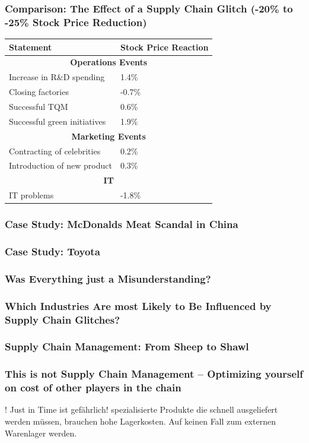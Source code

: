 \subsubsection{Comparison: The Effect of a Supply Chain Glitch	(-20\% to -25\% Stock Price Reduction)}
\begin{tabular}{|l|l|}
	\hline Statement & Stock Price Reaction \\ 
	\hline \multicolumn{2}{|c|}{ \textbf{Operations Events}}   \\ 
	\hline Increase in R\&D spending & 1.4\% \\ 
	\hline Closing factories & -0.7\% \\ 
	\hline Successful TQM & 0.6\%  \\ 
	\hline Successful green initiatives & 1.9\%  \\ 
	\hline  \multicolumn{2}{|c|}{ \textbf{Marketing Events}}    \\ 
	\hline Contracting of celebrities & 0.2\%  \\ 
	\hline Introduction of new product & 0.3\%  \\ 
	\hline  \multicolumn{2}{|c|}{ \textbf{IT}}    \\
	\hline  IT problems & -1.8\%  \\ 
	\hline 
\end{tabular} 
\subsubsection{Case Study: McDonalds Meat Scandal in China}
\subsubsection{Case Study: Toyota}
\subsubsection{Was Everything just a Misunderstanding? }
\subsubsection{Which Industries Are most Likely to Be Influenced by Supply Chain Glitches?}
\subsubsection{Supply Chain Management:	From Sheep to Shawl}
\subsubsection{This is not Supply Chain Management – Optimizing yourself on	cost of other players in the chain}
! Just in Time  ist gef\"ahrlich!
spezialisierte Produkte die schnell ausgeliefert werden m\"ussen, brauchen hohe Lagerkosten. Auf keinen Fall zum externen Warenlager werden.
